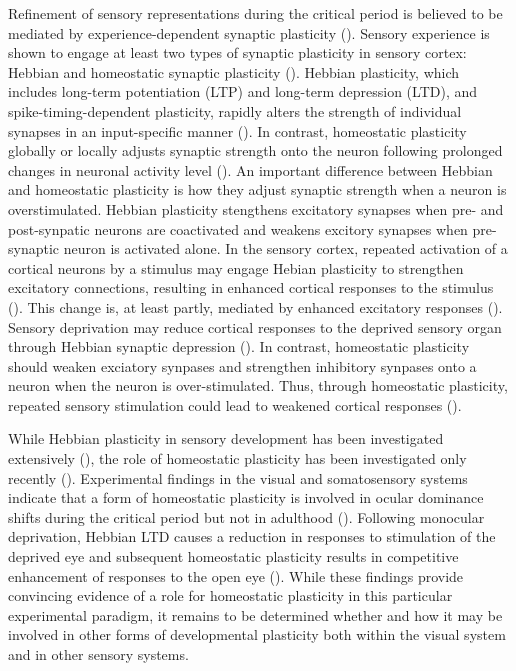Refinement of sensory representations during the critical period is believed to be mediated by experience-dependent synaptic plasticity (\cite{Dan2006, Feldman2009}). Sensory experience is shown to engage at least two types of synaptic plasticity in sensory cortex: Hebbian and homeostatic synaptic plasticity (\cite{Desai2002, Fu2002, Heynen2003, Crozier2007, Goel2007, Maffei2008}). Hebbian plasticity, which includes long-term potentiation (LTP) and long-term depression (LTD), and spike-timing­-dependent plasticity, rapidly alters the strength of individual synapses in an input-specific manner (\cite{Zhang1998, Abbott2000, Malenka2004, Dan2006}). In contrast, homeostatic plasticity globally or locally adjusts synaptic strength onto the neuron following prolonged changes in neuronal activity level (\cite{Davis2001, Burrone2003, Turrigiano2004, Hou2008}). An important difference between Hebbian and homeostatic plasticity is how they adjust synaptic strength when a neuron is overstimulated. Hebbian plasticity stengthens excitatory synapses when pre- and post-synpatic neurons are coactivated and weakens excitory synapses when pre-synaptic neuron is activated alone. In the sensory cortex, repeated activation of a cortical neurons by a stimulus may engage Hebian plasticity to strengthen excitatory connections, resulting in enhanced cortical responses to the stimulus (\cite{Zhang2001}). This change is, at least partly, mediated by enhanced excitatory responses (\cite{Froemke2007, Sun2010}). Sensory deprivation may reduce cortical responses to the deprived sensory organ through Hebbian synaptic depression (\cite{Heynen2003}). In contrast, homeostatic plasticity should weaken exciatory synpases and strengthen inhibitory synpases onto a neuron when the neuron is over-stimulated. Thus, through homeostatic plasticity, repeated sensory stimulation could lead to weakened cortical responses (\cite{Condon1991, Pienkowski2012}).

While Hebbian plasticity in sensory development has been investigated extensively (\cite{Feldman2009}), the role of homeostatic plasticity has been investigated only recently (\cite{Mrsic-Flogel2007}). Experimental findings in the visual and somatosensory systems indicate that a form of homeostatic plasticity is involved in ocular dominance shifts during the critical period but not in adulthood (\cite{Kaneko2008, Ranson2012}). Following monocular deprivation, Hebbian LTD causes a reduction in responses to stimulation of the deprived eye and subsequent homeostatic plasticity results in competitive enhancement of responses to the open eye (\cite{Frenkel2004, Kaneko2008, Ranson2012}). While these findings provide convincing evidence of a role for homeostatic plasticity in this particular experimental paradigm, it remains to be determined whether and how it may be involved in other forms of developmental plasticity both within the visual system and in other sensory systems.

